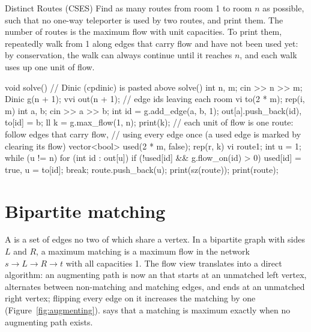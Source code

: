 \begin{problem}{Distinct Routes (CSES)}
Find as many routes from room 1 to room $n$ as possible, such that no one-way teleporter is used by two routes, and print them.
\solution The number of routes is the maximum flow with unit capacities. To print them, repeatedly walk from 1 along edges that
carry flow and have not been used yet: by conservation, the walk can always continue until it reaches $n$, and each walk uses up
one unit of flow.
\end{problem}

\begin{code}
void solve() {  // Dinic (cpdinic) is pasted above solve()
    int n, m;
    cin >> n >> m;
    Dinic g(n + 1);
    vvi out(n + 1);  // edge ids leaving each room
    vi to(2 * m);
    rep(i, m) {
        int a, b;
        cin >> a >> b;
        int id = g.add_edge(a, b, 1);
        out[a].push_back(id), to[id] = b;
    }
    ll k = g.max_flow(1, n);
    print(k);
    // each unit of flow is one route: follow edges that carry flow,
    // using every edge once (a used edge is marked by clearing its flow)
    vector<bool> used(2 * m, false);
    rep(r, k) {
        vi route{1};
        int u = 1;
        while (u != n) {
            for (int id : out[u])
                if (!used[id] && g.flow_on(id) > 0) {
                    used[id] = true, u = to[id];
                    break;
                }
            route.push_back(u);
        }
        print(sz(route));
        print(route);
    }
}
\end{code}

\section[Bipartite matching]{Bipartite matching \hfill \ioi}\label{sec:matching}

A  is a set of edges no two of which share a vertex. In a bipartite graph with sides $L$ and $R$, a maximum matching
is a maximum flow in the network $s \to L \to R \to t$ with all capacities 1. The flow view translates into a direct algorithm:
an augmenting path is now an  that starts at an unmatched left vertex, alternates between non-matching and
matching edges, and ends at an unmatched right vertex; flipping every edge on it increases the matching by one
(Figure~\ref{fig:augmenting}).  says that a matching is maximum exactly when no augmenting path exists.

